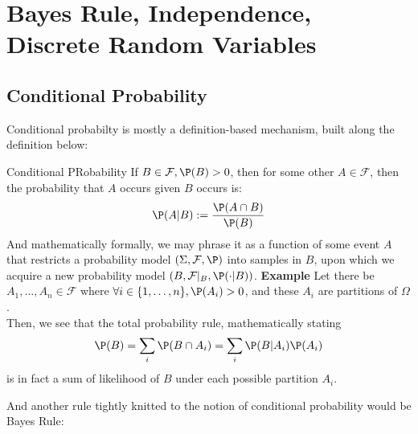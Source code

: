 \chapter{Bayes Rule, Independence, Discrete Random Variables}

\section{Conditional Probability}
Conditional probabilty is mostly a definition-based mechanism, built along the definition below:
\begin{ln-define}{Conditional PRobability}{}
    If $B \in \mathcal{F}, \P(B) > 0$, then for some other $A \in \mathcal{F}$, then the probability that $A$ occurs given $B$ occurs is:
    \[\P(A | B) := \frac{\P(A \cap B)}{\P(B)}\]
    And mathematically formally, we may phrase it as a function of some event $A$ that restricts a probability model $(\Sigma, \mathcal{F}, \P)$ into samples in $B$, upon which we acquire a new probability model $(B, \mathcal{F}|_B, \P(\cdot | B))$.
    \tcblower
    \textbf{Example} Let there be $A_1, \dots, A_n \in \mathcal{F}$ where $\forall i \in \{1, \dots, n\}, \P(A_i) > 0$, and these $A_i$ are partitions of $\Omega$. \\
    Then, we see that the total probability rule, mathematically stating
    \[\P(B) = \sum_i \P(B \cap A_i) = \sum_i \P(B | A_i)\P(A_i)\]
    is in fact a sum of likelihood of $B$ under each possible partition $A_i$.
\end{ln-define}
And another rule tightly knitted to the notion of conditional probability would be Bayes Rule:
